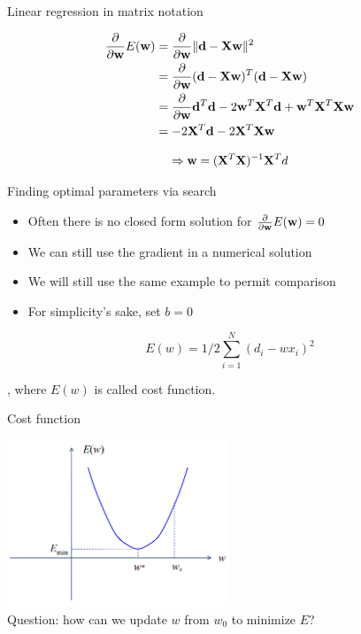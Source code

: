 \documentclass[notes]{beamer}
\providecommand{\tightlist}{%
  \setlength{\itemsep}{0pt}\setlength{\parskip}{0pt}}
\begin{document}
\begin{frame}{Linear regression in matrix notation}

\begin{equation*}
\begin{aligned}
\frac{\partial}{\partial \mathbf{w}} E(\mathbf{w}) & = \frac{\partial}{\partial \mathbf{w}} \| \mathbf{d} - \mathbf{X} \mathbf{w} \|^2 \\  
&= \frac{\partial}{\partial \mathbf{w}} (\mathbf{d} -\mathbf{X} \mathbf{w})^T(\mathbf{d} -\mathbf{X} \mathbf{w}) \\ 
&= \frac{\partial}{\partial \mathbf{w}} \mathbf{d}^T \mathbf{d} -2 \mathbf{w}^T \mathbf{X}^T \mathbf{d} + \mathbf{w}^T \mathbf{X}^T \mathbf{X} \mathbf{w} \\ 
&= -2 \mathbf{X}^T \mathbf{d} -2 \mathbf{X}^T \mathbf{X} \mathbf{w} 
\end{aligned}
\end{equation*}

\[\Rightarrow \mathbf{w} = (\mathbf{X} ^T \mathbf{X})^{-1} \mathbf{X}^T d\]

\end{frame}

\begin{frame}{Finding optimal parameters via search}

\begin{itemize}
\tightlist
\item
  Often there is no closed form solution for
  \(\frac{\partial}{\partial \mathbf{w}} E(\mathbf{w})=0\)
\item
  We can still use the gradient in a numerical solution
\item
  We will still use the same example to permit comparison
\item
  For simplicity's sake, set \(b = 0\)
\end{itemize}

\[E(w) = 1/2 \sum_{i=1}^{N} (d_i - wx_i)^2\]

, where \(E(w)\) is called cost function.

\end{frame}

\begin{frame}{Cost function}

\centering 

\includegraphics[width=0.50000\textwidth]{2018-03-09-22-15-39.png}\\

Question: how can we update \(w\) from \(w_0\) to minimize \(E\)?

\end{frame}
\end{document}
